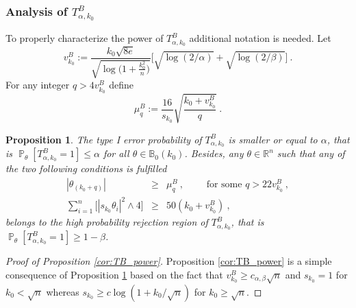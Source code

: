 \documentclass[twoside,11pt]{article}
\newtheorem{prp}{Proposition}
\def\beq{\begin{equation}}
\def\eeq{\end{equation}}
\renewcommand{\P}{\operatorname{\mathbb{P}}}
\newcommand{\<}{\langle}
\renewcommand{\>}{\rangle}
\begin{document}
 \subsubsection{Analysis of $T^{B}_{\alpha,k_0}$}
 

 
To properly characterize the power of $T^{B}_{\alpha,k_0}$ additional notation is needed. Let 
\beq\label{eq:definition_bk0}
 v_{k_0}^B:= \frac{k_0\sqrt{8e}}{\sqrt{\log\big(1+ \frac{k_0^2}{n}\big)}} \big[\sqrt{\log(2/\alpha)}+ \sqrt{\log(2/\beta)}\big]\ .
\eeq
For any integer $q>4v_{k_0}^B$ define 
\beq\label{eq:definition_muB}
 \mu^{B}_{q}:= \frac{16}{s_{k_0}}\sqrt{\frac{k_0+v_{k_0}^B}{q}} \ .
 \eeq

\begin{prp}\label{prp:test_log}
The type I error  probability of  $T^{B}_{\alpha,k_0}$ is smaller or equal to $\alpha$, that is 
$\P_{\theta}[T^{B}_{\alpha,k_0}=1]\leq \alpha$ for all $\theta\in \mathbb{B}_0(k_0)$.
 Besides, any $\theta\in \mathbb{R}^n$ such that any of the two following conditions is fulfilled
\begin{eqnarray}
 \label{eq:separation_test_log}
|\theta_{(k_0+q)}|&\geq& \mu^{B}_{q}\ ,\quad \quad \text{ for some } q > 22v_{k_0}^B \ ,\\ 
\label{eq:separation_test_log_l2}
\sum_{i=1}^n \Big[|s_{k_0} \theta_i|^2\wedge 4\Big]&\geq& 50(k_0+v_{k_0}^B)\ ,
\end{eqnarray}
belongs to the high probability rejection region of $T^{B}_{\alpha,k_0}$, that is $\P_{\theta}[T^{B}_{\alpha,k_0}=1]\geq 1-\beta$.

 \end{prp}


\begin{proof}[Proof of Proposition \ref{cor:TB_power}]
 Proposition \ref{cor:TB_power} is a simple consequence of Proposition \ref{prp:test_log} based on the fact that $v_{k_0}^B\geq c_{\alpha,\beta}\sqrt{n}$ and $s_{k_0}=1$ for $k_0< \sqrt{n}$ whereas $s_{k_0}\geq c \log(1+k_0/\sqrt{n})$ for $k_0\geq \sqrt{n}$. 
\end{proof}

 
 
\end{document}
